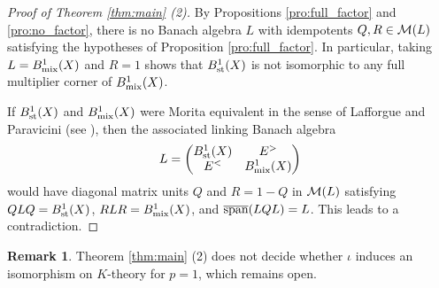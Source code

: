 \documentclass[11pt,reqno]{amsart}
\theoremstyle{definition}
\newtheorem{Rem}[Def]{Remark}
\theoremstyle{plain}
\begin{document}
\begin{proof}[Proof of Theorem \ref{thm:main} (2)]
By Propositions \ref{pro:full_factor} and \ref{pro:no_factor}, there is no Banach algebra $L$ with idempotents $Q,R\in\mathcal M(L)$ satisfying the hypotheses of Proposition \ref{pro:full_factor}. In particular, taking $L=B^1_{\textup{mix}}(X)$ and $R=1$ shows that $B^1_{\textup{st}}(X)$ is not isomorphic to any full multiplier corner of $B^1_{\textup{mix}}(X)$.

If $B^1_{\textup{st}}(X)$ and $B^1_{\textup{mix}}(X)$ were Morita equivalent in the sense of Lafforgue \cite{Laf02} and Paravicini \cite{Par09} (see \cite[Definition~2.12]{Chu25}), then the associated linking Banach algebra
\[
L=\begin{pmatrix}B^1_{\textup{st}}(X)&E^>\\E^<&B^1_{\textup{mix}}(X)\end{pmatrix}
\]
would have diagonal matrix units $Q$ and $R=1-Q$ in $\mathcal M(L)$ satisfying $QLQ=B^1_{\textup{st}}(X)$, $RLR=B^1_{\textup{mix}}(X)$, and $\overline{\textup{span}}(LQL)=L$. This leads to a contradiction.
\end{proof}

\begin{Rem}\label{rem:K}
Theorem \ref{thm:main} (2) does not decide whether $\iota$ induces an isomorphism on $K$-theory for $p=1$, which remains open.
\end{Rem}





\end{document}
